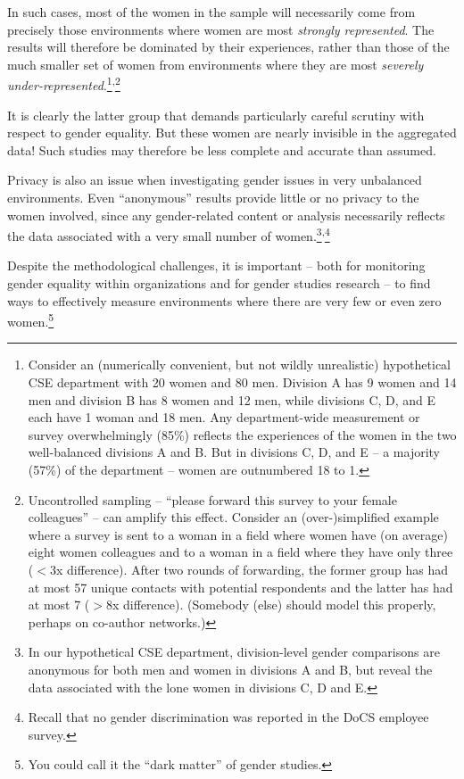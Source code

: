 \documentclass[a4paper,10pt,twocolumn]{article}
\begin{document}
In such cases, most of the women in the sample will necessarily come
from precisely those environments where women are most \emph{strongly
represented}.  The results will therefore be dominated by their
experiences, rather than those of the much smaller set of women from
environments where they are most \emph{severely
under-represented}.\footnote{Consider an (numerically convenient, but
not wildly unrealistic) hypothetical CSE department with 20 women and
80 men.  Division A has 9 women and 14 men and division B has 8 women
and 12 men, while divisions C, D, and E each have 1 woman and 18 men.
Any department-wide measurement or survey overwhelmingly (85\%)
reflects the experiences of the women in the two well-balanced
divisions A and B.  But in divisions C, D, and E -- a majority (57\%)
of the department -- women are outnumbered 18 to
1.}\textsuperscript{,}\footnote{ Uncontrolled sampling -- ``please
forward this survey to your female colleagues'' -- can amplify this
effect.  Consider an (over-)simplified example where a survey is sent
to a woman in a field where women have (on average) eight women
colleagues and to a woman in a field where they have only three ($<$3x
difference).  After two rounds of forwarding, the former group has had
at most 57 unique contacts with potential respondents and the latter
has had at most 7 ($>$8x difference).  (Somebody (else) should model
this properly, perhaps on co-author networks.)}

It is clearly the latter group that demands particularly careful
scrutiny with respect to gender equality.  But these women are nearly
invisible in the aggregated data!  Such studies may therefore be less
complete and accurate than assumed.

Privacy is also an issue when investigating gender issues in very
unbalanced environments.  Even ``anonymous'' results provide little or
no privacy to the women involved, since any gender-related content or
analysis necessarily reflects the data associated with a very small
number of women.\footnote{In our hypothetical CSE department,
division-level gender comparisons are anonymous for both men and women
in divisions A and B, but reveal the data associated with the lone
women in divisions C, D and E.}\textsuperscript{,}\footnote{Recall
that no gender discrimination was reported in the DoCS employee
survey.}

Despite the methodological challenges, it is important -- both for
monitoring gender equality within organizations and for gender studies
research -- to find ways to effectively measure environments where
there are very few or even zero women.\footnote{You could call it the
``dark matter'' of gender studies.}
\end{document}
